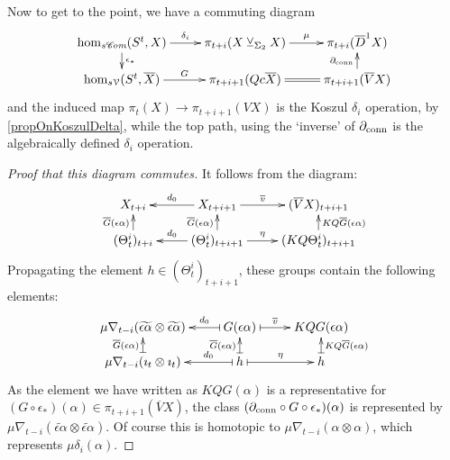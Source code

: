 \documentclass[11pt]{amsart}
\theoremstyle{plain}
\theoremstyle{definition}
\renewcommand{\to}{\longrightarrow}
\newcommand{\scrC}{\mathscr{C}}
\newcommand{\calV}{\mathcal{V}}
\theoremstyle{plain}
\newcommand{\Nabla}{\nabla}
\newcommand{\algs}{{\scrC\!\textit{om}}}
\newcommand{\smashcoprod}{\veebar}%
\begin{document}
\begin{Operations on the Bousfield-Kan spectral sequence}
Now to get to the point, we have a commuting diagram
\[\xymatrix@R=4mm{
\hom_{s\algs}(S^t,X)\ar[r]^-{\delta_i}
\ar[d]^-{\epsilon_*}
&%
\pi_{t+i}(X\smashcoprod_{\Sigma_2} X)\ar[r]^-{\mu}
&
\pi_{t+i}(\overline{D}^1X)
\\%
\hom_{s\calV}(S^t,\overline{X})\ar[r]^-{G}&%
\pi_{t+i+1}(Qc\overline{X})\ar@{=}[r]
&
\pi_{t+i+1}(\overline{V}X)
\ar[u]^-{\partial_\textup{conn}}
}\]
and the induced map $\pi_t(X)\to \pi_{t+i+1}(VX)$ is the Koszul $\delta_i$ operation, by \ref{propOnKoszulDelta}, while the top path, using the `inverse' of $\partial_\textup{conn}$ is the algebraically defined $\delta_i$ operation.
\begin{proof}[Proof that this diagram commutes]
It follows from the diagram:
\[\xymatrix@R=4mm{
X_{t+i}&%
X_{t+i+1}\ar[l]_-{d_0}
\ar[r]^-{\overline{v}}
&%
(\overline{V}X)_{t+i+1}\\%
(\Theta_t^i)_{t+i}\ar[u]^-{\overline{G}(\epsilon\alpha)}
&%
(\Theta_t^i)_{t+i+1}\ar[u]^-{\overline{G}(\epsilon\alpha)}\ar[r]^-{\eta}
\ar[l]_-{d_0}
&%
(KQ\Theta_t^i)_{t+i+1}\ar[u]_-{KQ\overline{G}(\epsilon\alpha)}%
}\]
Propagating the element $h\in (\Theta_t^i)_{t+i+1}$, these groups contain the following elements:
\[\xymatrix@R=4mm{
\mu\Nabla_{t-i}(\widetilde{\epsilon\alpha}\otimes \widetilde{\epsilon\alpha})&%
G(\epsilon\alpha)\ar@{|->}[l]_-{d_0}
\ar@{|->}[r]^-{\overline{v}}
&%
KQG(\epsilon\alpha)\\%
\mu\Nabla_{t-i}(\imath_t\otimes\imath_t)\ar@{|->}[u]^-{\overline{G}(\epsilon\alpha)}
&%
h\ar@{|->}[u]^-{\overline{G}(\epsilon\alpha)}\ar@{|->}[r]^-{\eta}
\ar@{|->}[l]_-{d_0}
&%
h\ar@{|->}[u]_-{KQ\overline{G}(\epsilon\alpha)}%
}\]
As the element we have written as $KQG(\alpha)$ is a representative for $(G\circ\epsilon_*)(\alpha)\in\pi_{t+i+1}(\overline{V}X)$, the class $(\partial_\textup{conn}\circ G\circ\epsilon_*)(\alpha)$ is represented by $\mu\Nabla_{t-i}(\widetilde{\epsilon\alpha}\otimes \widetilde{\epsilon\alpha})$. Of course this is homotopic to $\mu\Nabla_{t-i}(\alpha\otimes \alpha)$, which represents $\mu\delta_i(\alpha)$.
\end{proof}















\end{Operations on the Bousfield-Kan spectral sequence}
\end{document}
